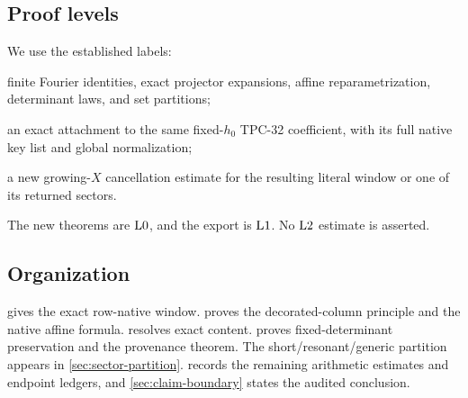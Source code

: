 \subsection{Proof levels}

We use the established labels:
\begin{description}[leftmargin=3em,style=nextline]
\item[\(\Lzero\)]
finite Fourier identities, exact projector expansions, affine
reparametrization, determinant laws, and set partitions;
\item[\(\Lone\)]
an exact attachment to the same fixed-\(h_0\) TPC-32 coefficient,
with its full native key list and global normalization;
\item[\(\Ltwo\)]
a new growing-\(X\) cancellation estimate for the resulting literal
window or one of its returned sectors.
\end{description}
The new theorems are \(\Lzero\), and the export is \(\Lone\).
No \(\Ltwo\) estimate is asserted.

\subsection{Organization}

 gives the exact row-native window.
 proves the decorated-column
principle and the native affine formula.
 resolves exact content.
 proves fixed-determinant preservation and
the provenance theorem.  The short/resonant/generic partition appears in
\cref{sec:sector-partition}.   records the
remaining arithmetic estimates and endpoint ledgers, and
\cref{sec:claim-boundary} states the audited conclusion.
